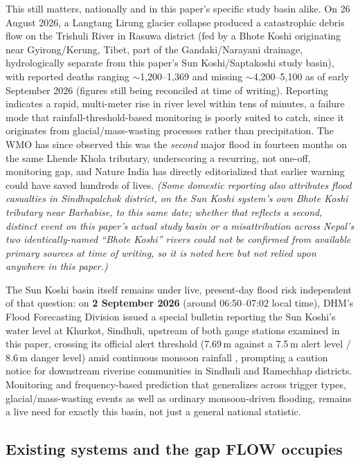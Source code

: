 \documentclass[11pt]{article}
\begin{document}
This still matters, nationally and in this paper's specific study basin alike. On 26 August 2026, a Langtang Lirung glacier collapse produced a catastrophic debris flow on the Trishuli River in Rasuwa district (fed by a Bhote Koshi originating near Gyirong/Kerung, Tibet, part of the Gandaki/Narayani drainage, hydrologically separate from this paper's Sun Koshi/Saptakoshi study basin), with reported deaths ranging ${\sim}$1,200--1,369 and missing ${\sim}$4,200--5,100 as of early September 2026 \citep{usgs2026,unfpa2026} (figures still being reconciled at time of writing). Reporting indicates a rapid, multi-meter rise in river level within tens of minutes, a failure mode that rainfall-threshold-based monitoring is poorly suited to catch, since it originates from glacial/mass-wasting processes rather than precipitation. The WMO \citep{wmo2026} has since observed this was the \emph{second} major flood in fourteen months on the same Lhende Khola tributary, underscoring a recurring, not one-off, monitoring gap, and Nature India \citep{natureindia2026} has directly editorialized that earlier warning could have saved hundreds of lives. \emph{(Some domestic reporting also attributes flood casualties in Sindhupalchok district, on the Sun Koshi system's own Bhote Koshi tributary near Barhabise, to this same date; whether that reflects a second, distinct event on this paper's actual study basin or a misattribution across Nepal's two identically-named ``Bhote Koshi'' rivers could not be confirmed from available primary sources at time of writing, so it is noted here but not relied upon anywhere in this paper.)}

The Sun Koshi basin itself remains under live, present-day flood risk independent of that question: on \textbf{2 September 2026} (around 06:50--07:02 local time), DHM's Flood Forecasting Division issued a special bulletin reporting the Sun Koshi's water level at Khurkot, Sindhuli, upstream of both gauge stations examined in this paper, crossing its official alert threshold (7.69\,m against a 7.5\,m alert level / 8.6\,m danger level) amid continuous monsoon rainfall \citep{dhm2026bulletin}, prompting a caution notice for downstream riverine communities in Sindhuli and Ramechhap districts. Monitoring and frequency-based prediction that generalizes across trigger types, glacial/mass-wasting events as well as ordinary monsoon-driven flooding, remains a live need for exactly this basin, not just a general national statistic.

\subsection{Existing systems and the gap FLOW occupies}
\end{document}
